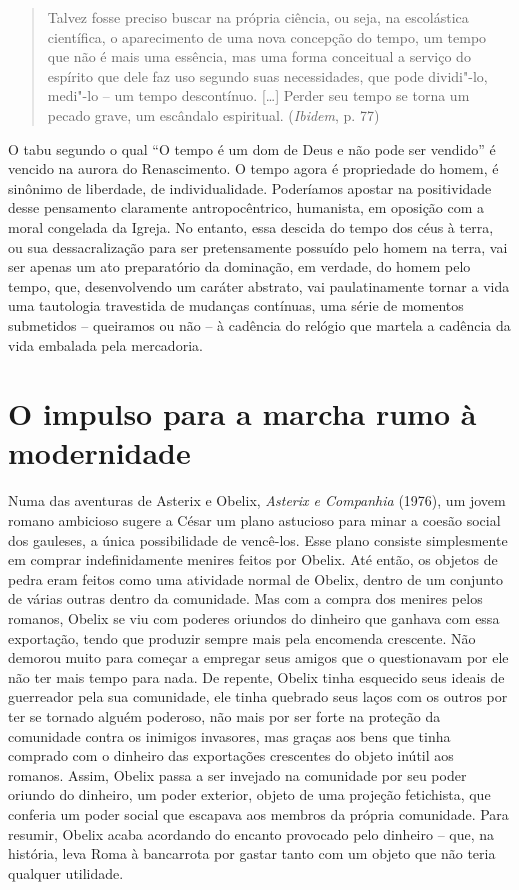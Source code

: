 \begin{quote}
Talvez fosse preciso buscar na própria ciência, ou seja, na escolástica
científica, o aparecimento de uma nova concepção do tempo, um tempo que
não é mais uma essência, mas uma forma conceitual a serviço do espírito
que dele faz uso segundo suas necessidades, que pode dividi"-lo, medi"-lo
-- um tempo descontínuo. [\ldots{}] Perder seu tempo se torna um
pecado grave, um escândalo espiritual. (\emph{Ibidem}, p. 77)
\end{quote}

O tabu segundo o qual ``O tempo é um dom de Deus e não pode ser
vendido'' é vencido na aurora do Renascimento. O tempo agora é
propriedade do homem, é sinônimo de liberdade, de individualidade.
Poderíamos apostar na positividade desse pensamento claramente
antropocêntrico, humanista, em oposição com a moral congelada da Igreja.
No entanto, essa descida do tempo dos céus à terra, ou sua
dessacralização para ser pretensamente possuído pelo homem na terra, vai
ser apenas um ato preparatório da dominação, em verdade, do homem pelo
tempo, que, desenvolvendo um caráter abstrato, vai paulatinamente tornar a
vida uma tautologia travestida de mudanças contínuas, uma série de
momentos submetidos -- queiramos ou não -- à cadência do relógio que
martela a cadência da vida embalada pela mercadoria.

\section{O impulso para a marcha rumo à modernidade}

Numa das aventuras de Asterix e Obelix, \emph{Asterix e Companhia}
(1976), um jovem romano ambicioso sugere a César um plano astucioso para
minar a coesão social dos gauleses, a única possibilidade de vencê-los.
Esse plano consiste simplesmente em comprar indefinidamente menires
feitos por Obelix. Até então, os objetos de pedra eram feitos como uma
atividade normal de Obelix, dentro de um conjunto de várias outras
dentro da comunidade. Mas com a compra dos menires pelos romanos, Obelix
se viu com poderes oriundos do dinheiro que ganhava com essa exportação,
tendo que produzir sempre mais pela encomenda crescente. Não demorou
muito para começar a empregar seus amigos que o questionavam por ele não
ter mais tempo para nada. De repente, Obelix tinha esquecido seus ideais
de guerreador pela sua comunidade, ele tinha quebrado seus laços com os
outros por ter se tornado alguém poderoso, não mais por ser forte na
proteção da comunidade contra os inimigos invasores, mas graças aos bens
que tinha comprado com o dinheiro das exportações crescentes do objeto
inútil aos romanos. Assim, Obelix passa a ser invejado na comunidade por
seu poder oriundo do dinheiro, um poder exterior, objeto de uma projeção
fetichista, que conferia um poder social que escapava aos membros
da própria comunidade. Para resumir, Obelix acaba acordando do
encanto provocado pelo dinheiro -- que, na história, leva Roma à
bancarrota por gastar tanto com um objeto que não teria qualquer
utilidade.

